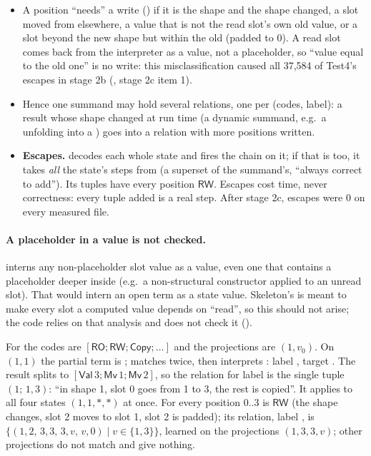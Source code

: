 \begin{itemize}
\item A position ``needs'' a write ()
  if it is the shape and the shape changed, a slot moved from elsewhere, a
  value that is not the read slot's own old value, or a slot beyond the
  new shape but within the old (padded to 0). A read slot comes back from
  the interpreter as a value, not a placeholder, so ``value equal to the
  old one'' is no write: this misclassification caused all 37,584 of
  Test4's escapes in stage 2b (, stage 2c item 1).
\item Hence one summand may hold several relations, one per (codes,
  label): a result whose shape changed at run time (a dynamic summand,
  e.g.\ a  unfolding into a ) goes into a relation
  with more positions written.
\item \textbf{Escapes.}  decodes each whole state and
  fires the chain on it; if that is  too, it takes
  \emph{all} the state's steps from  (a superset of the
  summand's, ``always correct to add''). Its tuples have every position
  $\mathsf{RW}$. Escapes cost time, never correctness: every tuple added is
  a real step. After stage 2c, escapes were 0 on every measured file.
\end{itemize}

\paragraph{A placeholder in a value is not checked.} 
interns any non-placeholder slot value as a value, even one that contains
a placeholder deeper inside (e.g.\ a non-structural constructor applied
to an unread slot). That would intern an open term as a state value.
Skeleton's  is meant to make every slot a computed
value depends on ``read'', so this should not arise; the code relies on
that analysis and does not check it ().

\begin{example}
For  the codes are $[\mathsf{RO};
\mathsf{RW}; \mathsf{Copy};\dots]$ and the projections are $(1, v_0)$.
On $(1,1)$ the partial term is
;  matches 
twice, then  interprets : label
, target . The result
 splits to $[\mathsf{Val}\,3; \mathsf{Mv}\,1;
\mathsf{Mv}\,2]$, so the relation for label  is the single
tuple $(1;\,1,3)$: ``in shape 1, slot 0 goes from 1 to 3, the rest is
copied''. It applies to all four states $(1,1,\ast,\ast)$ at once.
For  every position $0..3$ is $\mathsf{RW}$ (the shape
changes, slot 2 moves to slot 1, slot 2 is padded); its relation, label
, is $\{(1,2,\,3,3,\,3,v,\,v,0) \mid v \in\{1,3\}\}$, learned on
the projections $(1,3,3,v)$; other projections do not match
 and give nothing.
\end{example}

